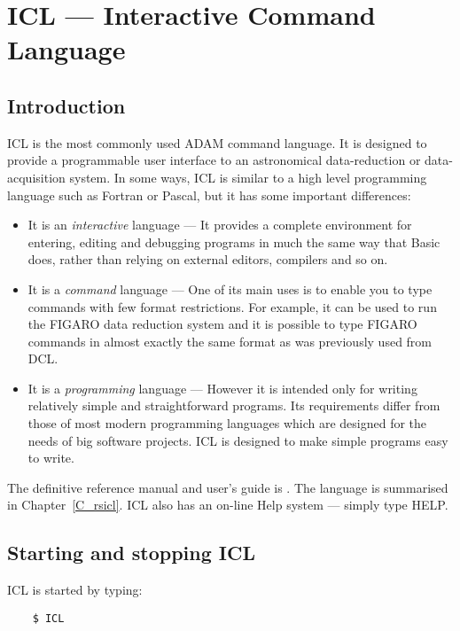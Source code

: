 \chapter{ICL --- Interactive Command Language}
\label{C_ugicl}

\section {Introduction}
\label{S_iclint}

ICL is the most commonly used ADAM command language.
It is designed to provide a programmable user interface to an astronomical
data-reduction or data-acquisition system.
In some ways, ICL is similar to a high level programming language such as
Fortran or Pascal, but it has some important differences:
\begin{itemize}
\item It is an {\em interactive\/} language ---
 It provides a complete environment for entering, editing and debugging
 programs in much the same way that Basic does, rather than relying on external
 editors, compilers and so on.
\item It is a {\em command\/} language ---
 One of its main uses is to enable you to type commands with few format
 restrictions.
 For example, it can be used to run the FIGARO data reduction system and it is
 possible to type FIGARO commands in almost exactly the same format as was
 previously used from DCL.
\item It is a {\em programming} language ---
 However it is intended only for writing relatively simple and straightforward
 programs.
 Its requirements differ from those of most modern programming languages which
 are designed for the needs of big software projects.
 ICL is designed to make simple programs easy to write.
\end{itemize}

The definitive reference manual and user's guide is .
The language is summarised in Chapter~\ref{C_rsicl}.
ICL also has an on-line Help system --- simply type HELP.

\section {Starting and stopping ICL}
\label{S_useicl}

ICL is started by typing:

\begin{small}
\begin{verbatim}
    $ ICL
\end{verbatim}
\end{small}

